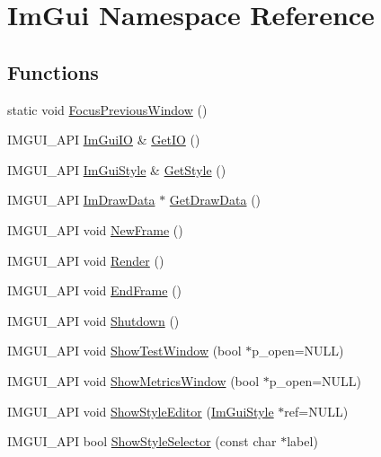 \hypertarget{namespace_im_gui}{}\section{Im\+Gui Namespace Reference}
\label{namespace_im_gui}
\subsection*{Functions}
\begin{DoxyCompactItemize}
\item 
static void \hyperlink{namespace_im_gui_a71f3fa3da1f6e029fb324d1d41fee0ad}{Focus\+Previous\+Window} ()
\item 
I\+M\+G\+U\+I\+\_\+\+A\+PI \hyperlink{struct_im_gui_i_o}{Im\+Gui\+IO} \& \hyperlink{namespace_im_gui_a3179e560812f878f3961ce803a5d9302}{Get\+IO} ()
\item 
I\+M\+G\+U\+I\+\_\+\+A\+PI \hyperlink{struct_im_gui_style}{Im\+Gui\+Style} \& \hyperlink{namespace_im_gui_abafef4bb3e3654efd96a47b2e22870a7}{Get\+Style} ()
\item 
I\+M\+G\+U\+I\+\_\+\+A\+PI \hyperlink{struct_im_draw_data}{Im\+Draw\+Data} $\ast$ \hyperlink{namespace_im_gui_ab73131dc44b1267dac04f0c2bb0af983}{Get\+Draw\+Data} ()
\item 
I\+M\+G\+U\+I\+\_\+\+A\+PI void \hyperlink{namespace_im_gui_ab3f1fc018f903b7ad79fd10663375774}{New\+Frame} ()
\item 
I\+M\+G\+U\+I\+\_\+\+A\+PI void \hyperlink{namespace_im_gui_ab51a164f547317c16c441f1599e3946d}{Render} ()
\item 
I\+M\+G\+U\+I\+\_\+\+A\+PI void \hyperlink{namespace_im_gui_a246c37da45e88a12ade440a0feacb4ee}{End\+Frame} ()
\item 
I\+M\+G\+U\+I\+\_\+\+A\+PI void \hyperlink{namespace_im_gui_aeba34069558d4fbcf734a9c92ce3b773}{Shutdown} ()
\item 
I\+M\+G\+U\+I\+\_\+\+A\+PI void \hyperlink{namespace_im_gui_a52880ae1ecdd704a083558d31c9bfa50}{Show\+Test\+Window} (bool $\ast$p\+\_\+open=N\+U\+LL)
\item 
I\+M\+G\+U\+I\+\_\+\+A\+PI void \hyperlink{namespace_im_gui_afe7a28c6eb52fff3cc27d5a698fea4ff}{Show\+Metrics\+Window} (bool $\ast$p\+\_\+open=N\+U\+LL)
\item 
I\+M\+G\+U\+I\+\_\+\+A\+PI void \hyperlink{namespace_im_gui_ab2eb3dec78d054fe3feab1c091ec5de5}{Show\+Style\+Editor} (\hyperlink{struct_im_gui_style}{Im\+Gui\+Style} $\ast$ref=N\+U\+LL)
\item 
I\+M\+G\+U\+I\+\_\+\+A\+PI bool \hyperlink{namespace_im_gui_a83f4e863c102b0a05e0e3308b371b394}{Show\+Style\+Selector} (const char $\ast$label)

\end{DoxyCompactItemize}

